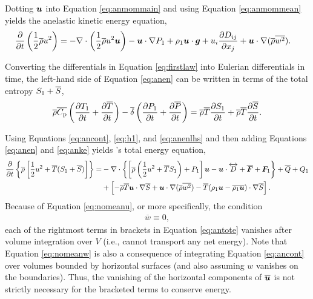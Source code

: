 \documentclass[12pt]{article}
\newcommand{\vecf}{\bm{F}}
\begin{document}
  
Dotting $\bm{u}$ into Equation \eqref{eq:anmommain} and using Equation \eqref{eq:anmommean} yields the anelastic kinetic energy equation,
	\begin{align}\label{eq:anke}
		\frac{\partial}{\partial t}\left(\frac{1}{2}\overline{\rho} u^2\right)&=-\nabla\cdot\left(\frac{1}{2}\overline{\rho} u^2\bm{u} \right) - \bm{u}\cdot\nabla P_1 + \rho_1\bm{u}\cdot\bm{g} + u_i\frac{\partial D_{ij}}{\partial x_j} + \bm{u}\cdot\nabla(\overline{\rho} \overline{w^2}).
	\end{align}

Converting the differentials in Equation \eqref{eq:firstlaw} into Eulerian differentials in time, the left-hand side of Equation \eqref{eq:anen} can be written in terms of the total entropy $S_1 + \overline{S}$, 
\begin{align}\label{eq:anenlhs}
	\overline{\rho}\overline{C_{\rm{p}}}\left(\frac{\partial T_1}{\partial t}+\frac{\partial\overline{T}}{\partial t}\right)- \overline{\delta}\left(\frac{\partial P_1}{\partial t} + \frac{\partial\overline{P}}{\partial t}\right) = \overline{\rho}\overline{T}\frac{\partial S_1}{\partial t} +  \overline{\rho}\overline{T}\frac{\partial\overline{S}}{\partial t}.
\end{align}

Using Equations \eqref{eq:ancont}, \eqref{eq:h1}, and \eqref{eq:anenlhs} and then adding Equations \eqref{eq:anen} and \eqref{eq:anke} yields \citet{Gough1969}'s total energy equation,
\begin{align}\label{eq:antote}
			\pderiv{}{t}\left\{\rhoover\left[\frac{1}{2} u^2 + \tmpover (\entrone+\entrover)\right]\right\} = &-\Div\left\{\left[\rhoover\left(\frac{1}{2} u^2 + \tmpover \entrone\right) + \prsone\right]\vecu- \vecu\cdot\overleftrightarrow{D} + \overline{\vecf} + \vecf_1\right\}+ \heatover + Q_1 \nonumber\\
			 &+\left[-\rhoover\tmpover\ugrad\entrover +\ugrad (\rhoover \overline{w^2})- \tmpover(\rhoone\vecu-\overline{\rhoone\vecu})\cdot\nabla\entrover\right].
\end{align}
Because of Equation \eqref{eq:nomeanu}, or more specifically, the condition
\begin{align}\label{eq:nomeanw}
	\overline{w}\equiv0,
\end{align}
 each of the rightmost terms in brackets in Equation \eqref{eq:antote} vanishes after volume integration over $V$ (i.e., cannot transport any net energy). Note that Equation \eqref{eq:nomeanw} is also a consequence of integrating Equation \eqref{eq:ancont} over volumes bounded by horizontal surfaces (and also assuming $w$ vanishes on the boundaries). Thus, the vanishing of the horizontal components of $\overline{\bm{u}}$ is not strictly necessary for the bracketed terms to conserve energy. 
 
\end{document}
